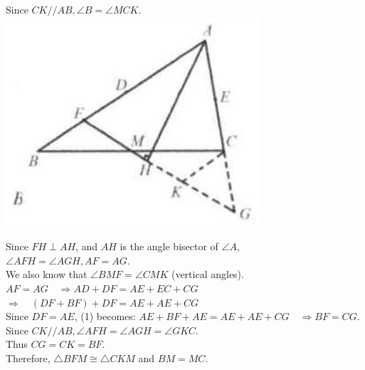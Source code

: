 \documentclass{article}
\begin{document}
Since \(C K / / A B, \angle B=\angle M C K\).\\
\centering
\includegraphics[width=\textwidth]{images/reasoning_image_1.jpg}

Since \(F H \perp A H\), and \(A H\) is the angle bisector of \(\angle A\),\\
\(\angle A F H=\angle A G H, A F=A G\).\\
We also know that \(\angle B M F=\angle C M K\) (vertical angles).\\
\(A F=A G \quad \Rightarrow A D+D F=A E+E C+C G\)\\
\(\Rightarrow \quad(D F+B F)+D F=A E+A E+C G\)\\
Since \(D F=A E\), (1) becomes: \(A E+B F+A E=A E+A E+C G \quad \Rightarrow B F=C G\).\\
Since \(C K / / A B, \angle A F H=\angle A G H=\angle G K C\).\\
Thus \(C G=C K=B F\).\\
Therefore, \(\triangle B F M \cong \triangle C K M\) and \(B M=M C\).
\end{document}
